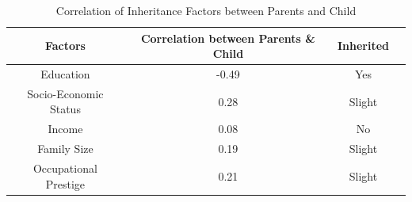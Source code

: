 \documentclass[12pt,twoside]{reedthesis}
\begin{document}
\begin{table}[htbp] %
\caption[Correlation of Inheritance Factors between Parents and Child]{Correlation of Inheritance Factors between Parents and Child}
\begin{center}
\begin{tabular}{c c c c}
\toprule %
  Factors &  Correlation between Parents \& Child & Inherited \\ %
  \midrule %
        Education                               & -0.49 & Yes    \\ %
        Socio-Economic Status   & 0.28  & Slight \\
        Income                                  & 0.08  & No     \\
        Family Size                     & 0.19  & Slight \\
        Occupational Prestige   & 0.21  & Slight \\
\bottomrule %
\end{tabular}
\end{center}
\label{inheritance} %
\end{table}

        \clearpage
\end{document}
